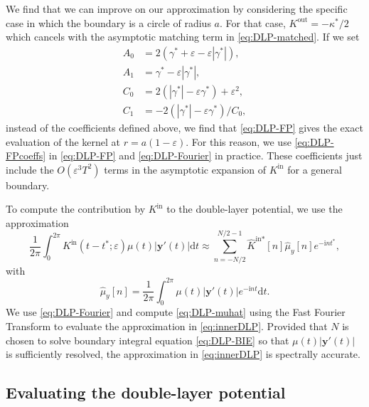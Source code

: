 \documentclass{article}[12pt]
\renewcommand{\epsilon}{\varepsilon}
\numberwithin{equation}{section}
\begin{document}
We find that we can improve on our approximation by considering the
specific case in which the boundary is a circle of radius $a$. For
that case, $K^{\text{out}} = - \kappa^{\ast}/2$ which cancels with the
asymptotic matching term in \eqref{eq:DLP-matched}. If we set
\begin{subequations}
  \begin{align}
    A_{0} &= 2 ( \gamma^{\ast} + \epsilon - \epsilon | \gamma^{\ast} |),\\
    A_{1} &= \gamma^{\ast} - \epsilon | \gamma^{\ast} |,\\
    C_{0} &= 2 ( | \gamma^{\ast} | - \epsilon \gamma^{\ast} ) +
            \epsilon^{2},\\
    C_{1} &= - 2 ( | \gamma^{\ast} | - \epsilon \gamma^{\ast} ) / C_{0},
  \end{align}
  \label{eq:DLP-FPcoeffs}
\end{subequations}
instead of the coefficients defined above, we find that
\eqref{eq:DLP-FP} gives the exact evaluation of the kernel at
$r = a ( 1 - \epsilon )$. For this reason, we use
\eqref{eq:DLP-FPcoeffs} in \eqref{eq:DLP-FP} and
\eqref{eq:DLP-Fourier} in practice. These coefficients just include
the $O(\epsilon^3T^2)$ terms in the asymptotic
expansion of $K^{\text{in}}$ for a general boundary.

To compute the contribution by $K^{\text{in}}$ to the
  double-layer potential, we use the approximation
\begin{equation}
  \frac{1}{2\pi} \int_{0}^{2\pi} K^{\text{in}}(t - t^{\ast};\epsilon)
  \mu(t) | \mathbf{y}'(t) | \mathrm{d}t \approx \sum_{n = -N/2}^{N/2-1}
  \hat{K}^{\text{in} \ast}[n] \hat{\mu}_y[n] e^{-\mathrm{i}n t^\ast},
  \label{eq:innerDLP}
\end{equation}
with
\begin{equation}
  \hat{\mu}_y[n] = \frac{1}{2\pi} \int_{0}^{2\pi} \mu(t) | \mathbf{y}'(t)
  | e^{-\mathrm{i} n t} \mathrm{d}t.
  \label{eq:DLP-muhat}
\end{equation}
We use \eqref{eq:DLP-Fourier} and compute \eqref{eq:DLP-muhat} using
the Fast Fourier Transform to evaluate the approximation in
\eqref{eq:innerDLP}. Provided that $N$ is chosen to solve boundary
integral equation \eqref{eq:DLP-BIE} so that $\mu(t) | \mathbf{y}'(t)
|$ is sufficiently resolved, the approximation in \eqref{eq:innerDLP}
is spectrally accurate.

\subsection{Evaluating the double-layer potential}
\end{document}
